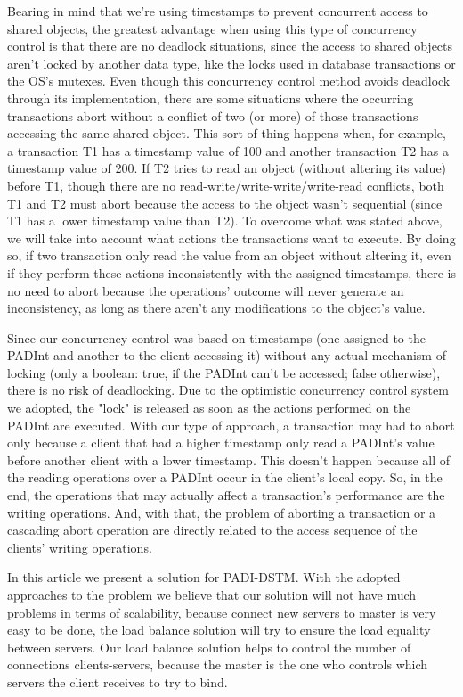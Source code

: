 \documentclass[times, 10pt,twocolumn]{article}
\begin{document}
Bearing in mind that we're using timestamps to prevent concurrent access to shared objects, the greatest advantage when using this type of concurrency control is that there are no deadlock situations, since the access to shared objects aren't locked by another data type, like the locks used in database transactions or the OS's mutexes.
Even though this concurrency control method avoids deadlock through its implementation, there are some situations where the occurring transactions abort without a conflict of two (or more) of those transactions accessing the same shared object. This sort of thing happens when, for example, a transaction T1 has a timestamp value of 100 and another transaction T2 has a timestamp value of 200. If T2 tries to read an object (without altering its value) before T1, though there are no read-write/write-write/write-read conflicts, both T1 and T2 must abort because the access to the object wasn't sequential (since T1 has a lower timestamp value than T2).
To overcome what was stated above, we will take into account what actions the transactions want to execute. By doing so, if two transaction only read the value from an object without altering it, even if they perform these actions inconsistently with the assigned timestamps, there is no need to abort because the operations' outcome will never generate an inconsistency, as long as there aren't any modifications to the object's value.

Since our concurrency control was based on timestamps (one assigned to the PADInt and another to the client accessing it) without any actual mechanism of locking (only a boolean: true, if the PADInt can't be accessed; false otherwise), there is no risk of deadlocking. Due to the optimistic concurrency control system we adopted, the "lock" is released as soon as the actions performed on the PADInt are executed.
With our type of approach, a transaction may had to abort only because a client that had a higher timestamp only read a PADInt's value before another client with a lower timestamp. This doesn't happen because all of the reading operations over a PADInt occur in the client's local copy. So, in the end, the operations that may actually affect a transaction's performance are the writing operations. And, with that, the problem of aborting a transaction or a cascading abort operation are directly related to the access sequence of the clients' writing operations.


In this article we present a solution for PADI-DSTM. With the adopted approaches to the problem we believe that our solution will not have much problems in terms of scalability, because connect new servers to master is very easy to be done, the load balance solution will try to ensure the load equality between servers. Our load balance solution helps to control the number of connections clients-servers, because the master is the one who controls which servers the client receives to try to bind.
\end{document}
